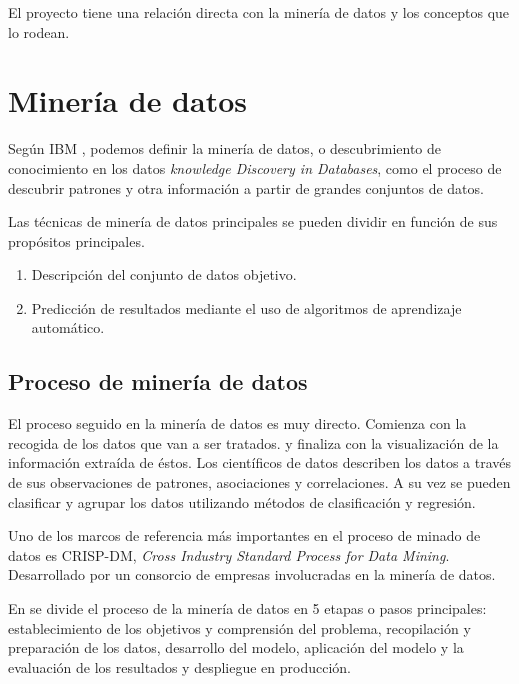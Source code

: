 
El proyecto tiene una relación directa con la minería de datos y los conceptos que lo rodean. 

\section{Minería de datos}

Según IBM \cite{IBM-WhatisDataMining}, podemos definir la minería de datos, o descubrimiento de conocimiento
en los datos \textit{knowledge Discovery in Databases}, como el proceso de descubrir patrones y otra
información a partir de grandes conjuntos de datos. 

Las técnicas de minería de datos principales se pueden dividir en función de sus propósitos principales.
\begin{enumerate}
    \item Descripción del conjunto de datos objetivo.
    \item Predicción de resultados mediante el uso de algoritmos de aprendizaje automático.
\end{enumerate}

\subsection{Proceso de minería de datos}
El proceso seguido en la minería de datos es muy directo. Comienza con la recogida de los datos que van a ser
tratados. y finaliza con la visualización de la información extraída de éstos. 
Los científicos de datos describen los datos a través de sus observaciones de patrones, asociaciones y correlaciones. A su vez se pueden clasificar y agrupar los datos utilizando métodos de clasificación y regresión.

Uno de los marcos de referencia más importantes en el proceso de minado de datos es CRISP-DM, \textit{Cross Industry Standard Process for Data Mining}. Desarrollado por un consorcio de empresas involucradas en la minería de datos. \cite{Chapman2000CRISPDM1S}


En \cite{KOTU201517} se divide el proceso de la minería de datos en 5 etapas o pasos principales: establecimiento de los objetivos y comprensión del problema, recopilación y preparación de los datos, desarrollo del modelo, aplicación del modelo y la evaluación de los resultados y despliegue en producción.

